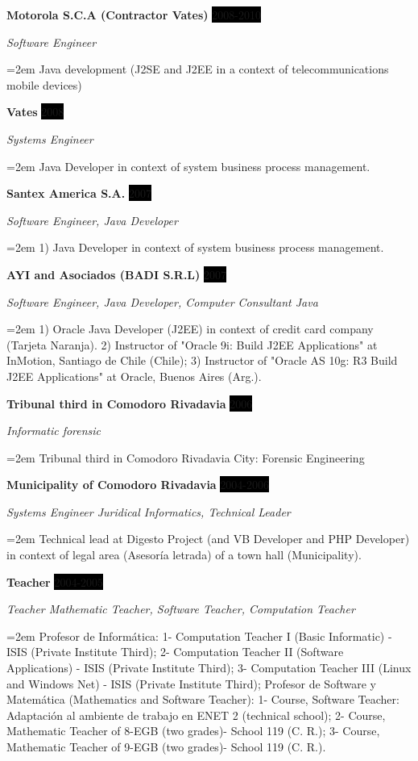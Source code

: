 \documentclass[paper=a4,fontsize=11pt]{scrartcl} %
\newcommand{\sepspace}{\vspace*{1em}}		%
\newcommand{\EducationEntry}[4]{ %
		\noindent \textbf{#1} \hfill      %
		\colorbox{Black}{%
			\parbox{6em}{%
			\hfill\color{White}#2}} \par  %
		\noindent \textit{#3} \par        %
		\noindent\hangindent=2em\hangafter=0 \small #4 %
		\normalsize \par}
\newcommand{\WorkEntry}[4]{				  %
		\noindent \textbf{#1} \hfill      %
		\colorbox{Black}{\color{White}#2} \par  %
		\noindent \textit{#3} \par              %
		\noindent\hangindent=2em\hangafter=0 \small #4 %
		\normalsize \par}
\begin{document}
\WorkEntry{Motorola S.C.A (Contractor Vates)}{2008-2010}{Software Engineer}
{Java development (J2SE and J2EE in a context of telecommunications mobile devices)}
\sepspace

\WorkEntry{Vates}{2008}{Systems Engineer}
{Java Developer in context of system business process management.}
\sepspace

\WorkEntry{Santex America S.A.}{2007}{Software Engineer, Java Developer}
{1) Java Developer in context of system business process management.}
\sepspace

\WorkEntry{AYI and Asociados (BADI S.R.L)}{2007}{Software Engineer, Java Developer, Computer Consultant Java}
{1) Oracle Java Developer (J2EE) in context of credit card company (Tarjeta Naranja).
2) Instructor of "Oracle 9i: Build J2EE Applications" at InMotion, Santiago de Chile (Chile);
3) Instructor of "Oracle AS 10g: R3 Build J2EE Applications" at Oracle, Buenos Aires (Arg.).}
\sepspace

\WorkEntry{Tribunal third in Comodoro Rivadavia}{2006}{Informatic forensic}{
Tribunal third in Comodoro Rivadavia City: Forensic Engineering}
\sepspace

\WorkEntry{Municipality of Comodoro Rivadavia}{2004-2006}{Systems Engineer Juridical Informatics, Technical Leader}
{Technical lead at Digesto Project (and VB Developer and PHP Developer) in context of legal area (Asesoría letrada) of a town hall (Municipality).}
\sepspace

\WorkEntry{Teacher}{2004-2005}{Teacher Mathematic Teacher, Software Teacher, Computation Teacher}
{Profesor de Informática: 1- Computation Teacher I (Basic Informatic) - ISIS (Private Institute Third); 2- Computation Teacher II (Software Applications) - ISIS (Private Institute Third); 3- Computation Teacher III (Linux and Windows Net) - ISIS (Private Institute Third); Profesor de Software y Matemática (Mathematics and Software Teacher): 1- Course, Software Teacher: Adaptación al ambiente de trabajo en ENET 2 (technical school); 2- Course, Mathematic Teacher of 8-EGB  (two grades)- School 119 (C. R.); 3- Course, Mathematic Teacher of 9-EGB (two grades)- School 119 (C. R.).
}
\sepspace
\end{document}
